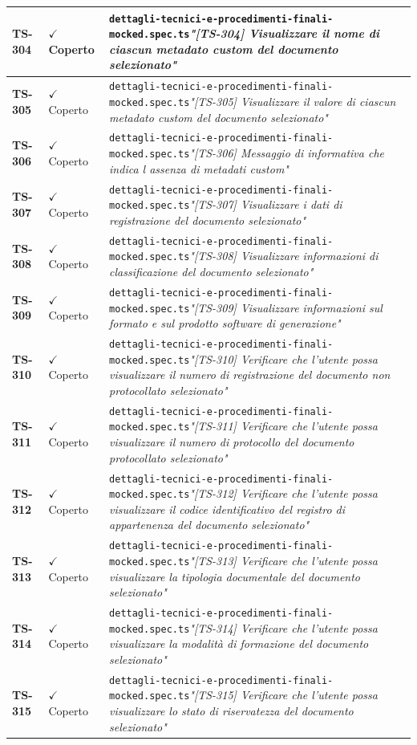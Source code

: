 \documentclass[a4paper,12pt]{article}
\newcommand{\ok}{\textcolor{green!60!black}{$\checkmark$ Coperto}}
\newcommand{\f}[1]{\nolinkurl{#1}\newline}
\newcommand{\q}[1]{\textit{#1}}
\begin{document}
\begin{longtable}{|p{1.5cm}|p{3.0cm}|p{10.5cm}|}
\textbf{TS-304} & \ok & \f{dettagli-tecnici-e-procedimenti-finali-mocked.spec.ts}\q{"[TS-304] Visualizzare il nome di ciascun metadato custom del documento selezionato"} \\ \hline
\textbf{TS-305} & \ok & \f{dettagli-tecnici-e-procedimenti-finali-mocked.spec.ts}\q{"[TS-305] Visualizzare il valore di ciascun metadato custom del documento selezionato"} \\ \hline
\textbf{TS-306} & \ok & \f{dettagli-tecnici-e-procedimenti-finali-mocked.spec.ts}\q{"[TS-306] Messaggio di informativa che indica l assenza di metadati custom"} \\ \hline
\textbf{TS-307} & \ok & \f{dettagli-tecnici-e-procedimenti-finali-mocked.spec.ts}\q{"[TS-307] Visualizzare i dati di registrazione del documento selezionato"} \\ \hline
\textbf{TS-308} & \ok & \f{dettagli-tecnici-e-procedimenti-finali-mocked.spec.ts}\q{"[TS-308] Visualizzare informazioni di classificazione del documento selezionato"} \\ \hline
\textbf{TS-309} & \ok & \f{dettagli-tecnici-e-procedimenti-finali-mocked.spec.ts}\q{"[TS-309] Visualizzare informazioni sul formato e sul prodotto software di generazione"} \\ \hline
\textbf{TS-310} & \ok & \f{dettagli-tecnici-e-procedimenti-finali-mocked.spec.ts}\q{"[TS-310] Verificare che l'utente possa visualizzare il numero di registrazione del documento non protocollato selezionato"} \\ \hline
\textbf{TS-311} & \ok & \f{dettagli-tecnici-e-procedimenti-finali-mocked.spec.ts}\q{"[TS-311] Verificare che l'utente possa visualizzare il numero di protocollo del documento protocollato selezionato"} \\ \hline
\textbf{TS-312} & \ok & \f{dettagli-tecnici-e-procedimenti-finali-mocked.spec.ts}\q{"[TS-312] Verificare che l'utente possa visualizzare il codice identificativo del registro di appartenenza del documento selezionato"} \\ \hline
\textbf{TS-313} & \ok & \f{dettagli-tecnici-e-procedimenti-finali-mocked.spec.ts}\q{"[TS-313] Verificare che l'utente possa visualizzare la tipologia documentale del documento selezionato"} \\ \hline
\textbf{TS-314} & \ok & \f{dettagli-tecnici-e-procedimenti-finali-mocked.spec.ts}\q{"[TS-314] Verificare che l'utente possa visualizzare la modalità di formazione del documento selezionato"} \\ \hline
\textbf{TS-315} & \ok & \f{dettagli-tecnici-e-procedimenti-finali-mocked.spec.ts}\q{"[TS-315] Verificare che l'utente possa visualizzare lo stato di riservatezza del documento selezionato"} \\ \hline

\end{longtable}
\end{document}
